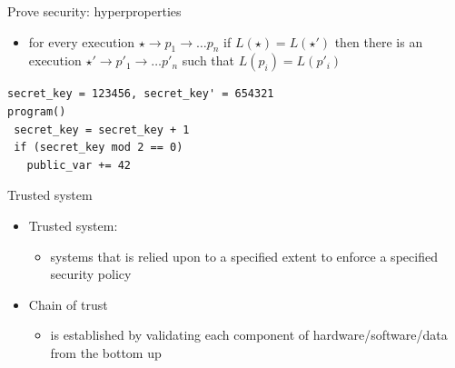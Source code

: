 \documentclass{beamer}
\begin{document}
\begin{frame}[fragile]{Prove security: hyperproperties}
  \begin{itemize}
  \item for every execution $\star \rightarrow p_1 \rightarrow \dots p_n$
    if $L(\star) = L(\star')$  then there is an execution
    $\star' \rightarrow p'_1 \rightarrow \dots p'_n$
  such that $L(p_i) = L(p'_i)$
  \end{itemize}
  \begin{verbatim}
secret_key = 123456, secret_key' = 654321
program()
 secret_key = secret_key + 1
 if (secret_key mod 2 == 0)
   public_var += 42
  \end{verbatim}
\end{frame}

\begin{frame}{Trusted system}
  \begin{itemize}
  \item Trusted system:
    \begin{itemize}
    \item systems that is relied upon to a specified extent to enforce a specified security policy
    \end{itemize}
  \item Chain of trust
    \begin{itemize}
    \item is established by validating each component of hardware/software/data from the bottom up
    \end{itemize}
  \end{itemize}
\end{frame}
\end{document}
